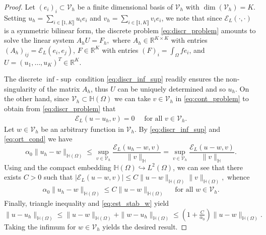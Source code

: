 \documentclass[11 pt]{article}
\newcommand\inter[1]{\llbracket #1\rrbracket}
\numberwithin{equation}{section}
\def\R{\mathbb{R}}
\def\cE{\mathcal{E}}
\begin{document}
\begin{proof}
Let $(e_i)_i\subset \mathcal V_h$ be a finite dimensional basis of $\mathcal V_h$ with $\dim(\mathcal V_h)=K$. Setting $u_h=\sum_{i\in\inter{1,K}}u_i e_i$ and $v_h=\sum_{i\in\inter{1,K}} v_i e_i$, we note that since $\cE_{L}(\cdot,\cdot)$ is a symmetric bilinear form, the discrete problem \eqref{eq:discr_problem} amounts to solve the linear system $A_h U = F_h,$ where $A_h\in\mathbb R^{K\times K}$ with entries $(A_h)_{ij}=\cE_L(e_i,e_j)$, $F\in\R^{K}$ with entries $(F)_i=\int_{\Omega}f e_i$, and $U=(u_1,\ldots, u_K)^T\in \R^{K}$.

The discrete $\inf$-$\sup$ condition \eqref{eq:discr_inf_sup} readily ensures the non-singularity of the matrix $A_h$, thus $U$ can be uniquely determined and so $u_h$. On the other hand, since $\mathcal V_h\subset \mathbb H(\Omega)$ we can take $v\in \mathcal V_h$ in \eqref{eq:cont_problem} to obtain from \eqref{eq:discr_problem} that
%
\begin{align}\label{eq:ort_cond}
    \cE_{L}(u-u_h,v)=0 \quad\text{ for all } v\in\mathcal V_h.
\end{align}
%
Let $w\in\mathcal V_h$ be an arbitrary function in $\mathcal V_h$. By \eqref{eq:discr_inf_sup} and \eqref{eq:ort_cond} we have
%
\begin{equation*}
    \alpha_0\|u_h-w\|_{\mathbb H(\Omega)} \leq \sup_{v\in\mathcal V_h}\frac{\cE_{L}(u_h-w,v)}{\|v\|_{\mathbb H}}=\sup_{v\in\mathcal V_h}\frac{\cE_{L}(u-w,v)}{\|v\|_{\mathbb H}}.
\end{equation*}
%
Using \cite[Lemma 3.4]{HSS22} and the compact embedding $\mathbb H(\Omega)\hookrightarrow L^2(\Omega)$, we can see that there exists $C>0$ such that $|\cE_{L}(u-w,v)|\leq C\|u-w\|_{\mathbb H(\Omega)}\|v\|_{\mathbb H(\Omega)},$ whence
%
\begin{align}\label{eq:est_stab_w}
    \alpha_0\|u_h-w\|_{\mathbb H(\Omega)} \leq C\|u-w\|_{\mathbb H(\Omega)} \quad\text{ for all } w\in\mathcal V_h.
\end{align}
Finally, triangle inequality and \eqref{eq:est_stab_w} yield $\|u-u_h\|_{\mathbb H(\Omega)}\leq \|u-w\|_{\mathbb H(\Omega)}+\|w-u_h\|_{\mathbb H(\Omega)}\leq \left(1+\frac{C}{\alpha_0}\right)\|u-w\|_{\mathbb H(\Omega)}.$ Taking the infimum for $w\in \mathcal V_h$ yields the desired result.
\end{proof}
\end{document}
